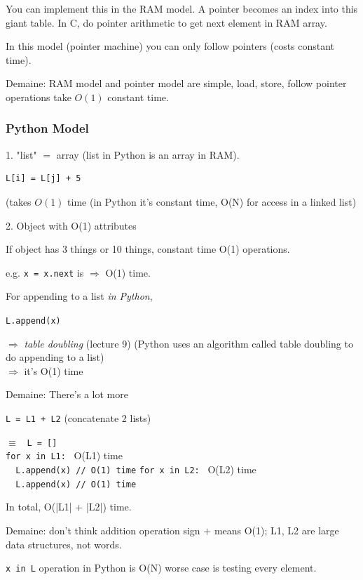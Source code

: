 \documentclass[10pt]{amsart}
\begin{document}
You can implement this in the RAM model. A pointer becomes an index into this giant table. In C, do pointer arithmetic to get next element in RAM array.

In this model (pointer machine) you can only follow pointers (costs constant time).

Demaine: RAM model and pointer model are simple, load, store, follow pointer operations take $O(1)$ constant time.

\subsubsection{Python Model}

1. "list" $=$ array (list in Python is an array in RAM).

\begin{verbatim}
L[i] = L[j] + 5	
\end{verbatim}
(takes $O(1)$ time (in Python it's constant time, O(N) for access in a linked list)

2. Object with O(1) attributes

If object has 3 things or 10 things, constant time O(1) operations.

e.g. \verb|x = x.next| is $\Longrightarrow$ O(1) time.

For appending to a list \emph{in Python},

\verb|L.append(x)|

$\Longrightarrow$ \emph{table doubling} (lecture 9) (Python uses an algorithm called table doubling to do appending to a list) \\
$\Longrightarrow$ it's O(1) time 

Demaine: There's a lot more 

\verb|L = L1 + L2| (concatenate 2 lists)

$\equiv $ \verb| L = [] | \\

\verb|for x in L1:| \quad \quad \, O(L1) time \\
\verb|  L.append(x) // O(1) time|
\verb|for x in L2:| \quad \quad \, O(L2) time \\
\verb|  L.append(x) // O(1) time|

In total, O(|L1| + |L2|) time.

Demaine: don't think addition operation sign $+$ means O(1); L1, L2 are large data structures, not words.

\verb|x in L| operation in Python is O(N) worse case is testing every element. \\
\end{document}

